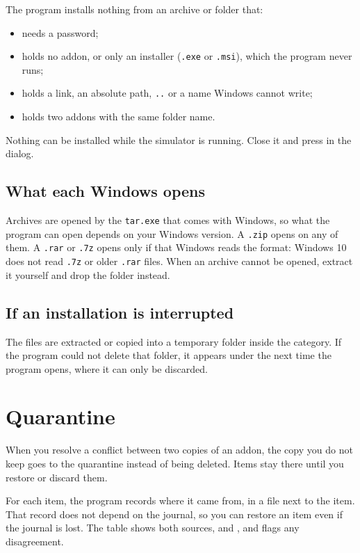 \documentclass[11pt,a4paper]{article}
\begin{document}
The program installs nothing from an archive or folder that:

\begin{itemize}
  \item needs a password;
  \item holds no addon, or only an installer (\texttt{.exe} or \texttt{.msi}),
    which the program never runs;
  \item holds a link, an absolute path, \texttt{..} or a name Windows cannot
    write;
  \item holds two addons with the same folder name.
\end{itemize}

Nothing can be installed while the simulator is running. Close it and press
 in the dialog.

\subsection{What each Windows opens}

Archives are opened by the \texttt{tar.exe} that comes with Windows, so what
the program can open depends on your Windows version. A \texttt{.zip} opens on
any of them. A \texttt{.rar} or \texttt{.7z} opens only if that Windows reads
the format: Windows 10 does not read \texttt{.7z} or older \texttt{.rar} files.
When an archive cannot be opened, extract it yourself and drop the folder
instead.

\subsection{If an installation is interrupted}

The files are extracted or copied into a temporary folder inside the category.
If the program could not delete that folder, it appears under  the next time the program opens, where it can only be discarded.

\section{Quarantine}

When you resolve a conflict between two copies of an addon, the copy you do not
keep goes to the quarantine instead of being deleted. Items stay there until
you restore or discard them.

For each item, the program records where it came from, in a file next to the
item. That record does not depend on the journal, so you can restore an item
even if the journal is lost. The table shows both sources, 
and , and flags any disagreement.
\end{document}
